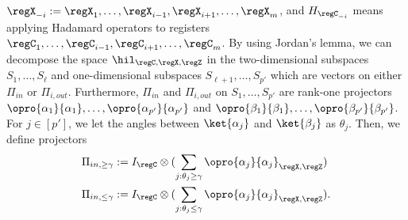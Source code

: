 $\regX_{-i}:= \regX_1,\dots,\regX_{i-1}, \regX_{i+1},\dots, \regX_{m}$, and $H_{\regC_{-i}}$ means applying Hadamard operators to registers $\regC_1,\dots,\regC_{i-1}, \regC_{i+1},\dots, \regC_{m}$. By using Jordan's lemma, we can decompose the space $\hil_{\regC,\regX,\regZ}$ in the two-dimensional subspaces $S_1,\dots,S_{\ell}$ and one-dimensional subspaces $S_{\ell+1},\dots,S_{p'}$ which are vectors on either $\Pi_{in}$ or $\Pi_{i,out}$. Furthermore, $\Pi_{in}$ and $\Pi_{i,out}$ on $S_1,\dots,S_{p'}$ are rank-one projectors $\opro{\alpha_1}{\alpha_1},\dots,\opro{\alpha_{p'}}{\alpha_{p'}}$ and $\opro{\beta_1}{\beta_1},\dots,\opro{\beta_{p'}}{\beta_{p'}}$. 
For $j\in [p']$, we let the angles between $\ket{\alpha_j}$ and $\ket{\beta_j}$ as $\theta_j$.  Then, we define projectors 
\begin{align*}
    &\Pi_{in, \geq\gamma} := I_{\regC}\otimes(\sum_{j: \theta_j\geq \gamma}\opro{\alpha_j}{\alpha_j}_{\regX,\regZ})\\
    &\Pi_{in, \leq\gamma} := I_{\regC}\otimes(\sum_{j: \theta_j\leq \gamma}\opro{\alpha_j}{\alpha_j}_{\regX,\regZ}).
\end{align*}


